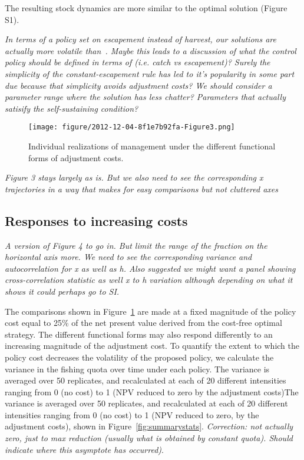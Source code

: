 \documentclass[authoryear, review, 12pt]{elsarticle}
\newcommand{\cdb}[1]{{\it \color{darkgreen} #1}}
\newcommand{\pa}[1]{{\it \color{darkblue} #1}}
\begin{document}
The resulting stock dynamics are more similar to the optimal solution (Figure S1).   

\cdb{ In terms of a policy set on escapement instead of harvest, our solutions are actually more volatile than~\citet{Reed1979}.  Maybe this leads to a discussion of what the control policy should be defined in terms of (i.e. catch vs escapement)?  Surely the simplicity of the constant-escapement rule has led to it's popularity in some part due because that simplicity avoids adjustment costs?  We should consider a parameter range where the solution has less chatter?  Parameters that actually satisify the \citet{Reed1979} self-sustaining condition?}

\begin{figure}
    \begin{center}
      \texttt{[image: figure/2012-12-04-8f1e7b92fa-Figure3.png]}
  \end{center}
  \caption{Individual realizations of management under the different functional forms of adjustment costs.} \label{fig:shapes}
\end{figure}

\pa{ 
  Figure 3 stays largely as is.  But we also need to see the corresponding x trajectories in a way that makes for easy comparisons but not cluttered axes
}

\subsection{Responses to increasing costs}


\pa{ 
 A version of Figure 4 to go in. But limit the range of the fraction on the horizontal axis more.  We need to see the corresponding variance and autocorrelation for x as well as h. Also suggested we might want a panel showing cross-correlation statistic as well x to h variation although depending on what it shows it could perhaps go to SI.
}


The comparisons shown in Figure~\ref{fig:shapes} are made at a fixed magnitude of the policy cost equal to 25\% of the net present value derived from the cost-free optimal strategy. The different functional forms may also respond differently to an increasing magnitude of the adjustment cost.  To quantify the extent to which the policy cost decreases the volatility of the proposed policy, we calculate the variance in the fishing quota over time under each policy. The variance is averaged over 50 replicates, and recalculated at each of 20 different intensities ranging from 0 (no cost) to 1 (NPV reduced to zero by the adjustment costs)The variance is averaged over 50 replicates, and recalculated at each of 20 different intensities ranging from 0 (no cost) to 1 (NPV reduced to zero, by the adjustment costs), shown in Figure~\ref{fig:summarystats}. \cdb{Correction: not actually zero, just to max reduction (usually what is obtained by constant quota).  Should indicate where this asymptote has occurred)}. 
\end{document}
